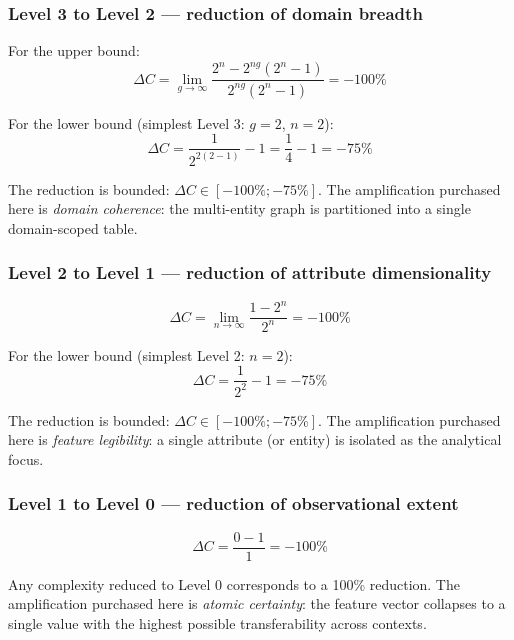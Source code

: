\documentclass[12pt,a4paper]{article}
\begin{document}
\subsubsection{Level 3 to Level 2 — reduction of domain breadth}
For the upper bound:
\begin{equation}
\Delta C = \lim_{g \to \infty} \frac{2^n - 2^{ng}(2^n - 1)}{2^{ng}(2^n - 1)} = -100\%
\end{equation}

For the lower bound (simplest Level 3: $g=2$, $n=2$):
\begin{equation}
\Delta C = \frac{1}{2^{2(2-1)}} - 1 = \frac{1}{4} - 1 = -75\%
\end{equation}

The reduction is bounded: $\Delta C \in [-100\%; -75\%]$. The amplification purchased here is \emph{domain coherence}: the multi-entity graph is partitioned into a single domain-scoped table.

\subsubsection{Level 2 to Level 1 — reduction of attribute dimensionality}
\begin{equation}
\Delta C = \lim_{n \to \infty} \frac{1 - 2^n}{2^n} = -100\%
\end{equation}

For the lower bound (simplest Level 2: $n=2$):
\begin{equation}
\Delta C = \frac{1}{2^2} - 1 = -75\%
\end{equation}

The reduction is bounded: $\Delta C \in [-100\%; -75\%]$. The amplification purchased here is \emph{feature legibility}: a single attribute (or entity) is isolated as the analytical focus.

\subsubsection{Level 1 to Level 0 — reduction of observational extent}
\begin{equation}
\Delta C = \frac{0 - 1}{1} = -100\%
\end{equation}

Any complexity reduced to Level 0 corresponds to a 100\% reduction. The amplification purchased here is \emph{atomic certainty}: the feature vector collapses to a single value with the highest possible transferability across contexts.

\end{document}
